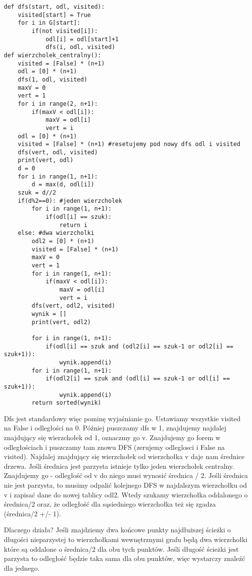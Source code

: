 \documentclass[12pt]{article}
\begin{document}
\begin{lstlisting}
def dfs(start, odl, visited):
    visited[start] = True
    for i in G[start]:
        if(not visited[i]):
            odl[i] = odl[start]+1 
            dfs(i, odl, visited)
def wierzcholek_centralny():
    visited = [False] * (n+1)
    odl = [0] * (n+1)
    dfs(1, odl, visited)
    maxV = 0
    vert = 1
    for i in range(2, n+1):
        if(maxV < odl[i]):
            maxV = odl[i]
            vert = i
    odl = [0] * (n+1)
    visited = [False] * (n+1) #resetujemy pod nowy dfs odl i visited
    dfs(vert, odl, visited)
    print(vert, odl)
    d = 0 
    for i in range(1, n+1):
        d = max(d, odl[i])
    szuk = d//2
    if(d%2==0): #jeden wierzcholek 
        for i in range(1, n+1):
            if(odl[i] == szuk):
                return i    
    else: #dwa wierzcholki 
        odl2 = [0] * (n+1)
        visited = [False] * (n+1)
        maxV = 0
        vert = 1
        for i in range(1, n+1):
            if(maxV < odl[i]):
                maxV = odl[i]
                vert = i
        dfs(vert, odl2, visited)
        wynik = []
        print(vert, odl2)

        for i in range(1, n+1):
            if(odl[i] == szuk and (odl2[i] == szuk-1 or odl2[i] == szuk+1)):
                wynik.append(i)
        for i in range(1, n+1):
            if(odl2[i] == szuk and (odl[i] == szuk-1 or odl[i] == szuk+1)):
                wynik.append(i)
        return sorted(wynik)
\end{lstlisting}

Dfs jest standardowy więc pominę wyjaśnianie go. 
Ustawiamy wszystkie visited na False i odległości na 0. Później puszczamy dfs w 1, znajdujemy najdalej znajdujący się wierzchołek od 1, oznaczmy go v. Znajdujemy go forem w odległościach i puszczamy tam znowu DFS (zerujemy odleglosci i False na visited). Najdalej znajdujący się wierzchołek od wierzchołka v daje nam średnice drzewa. Jeśli średnica jest parzysta istnieje tylko jeden wierzchołek centralny. Znajdujemy go - odległość od v do niego musi wynosić średnica / 2.
Jeśli średnica nie jest parzysta, to musimy odpalić kolejnego DFS w najdalszym wierzchołku od v i zapisać dane do nowej tablicy odl2. Wtedy szukamy wierzchołka oddalonego o średnica/2 oraz, że odległość dla sąsiedniego wierzchołka też się zgadza (średnica/2 +/- 1). 

Dlaczego działa? Jeśli znajdziemy dwa końcowe punkty najdłuższej ścieżki o długości nieparzystej to wierzchołkami wewnętrznymi grafu będą dwa wierzchołki które są oddalone o średnica/2 dla obu tych punktów. Jeśli długość ścieżki jest parzysta to odległość będzie taka sama dla obu punktów, więc wystarczy znaleźć dla jednego.
\end{document}
